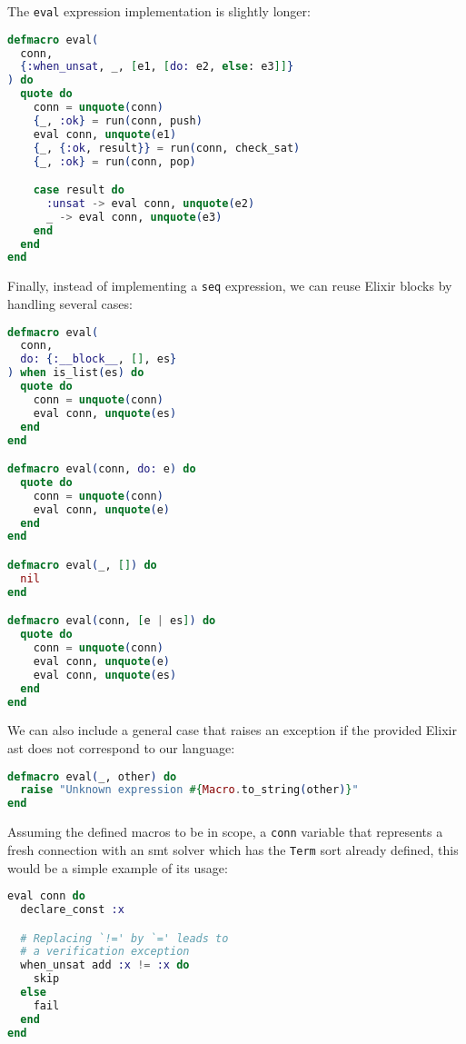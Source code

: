 The \verb|eval| expression implementation is slightly longer:

\begin{lstlisting}[language=elixir,numbers=none,frame=none]
defmacro eval(
  conn, 
  {:when_unsat, _, [e1, [do: e2, else: e3]]}
) do
  quote do
    conn = unquote(conn)
    {_, :ok} = run(conn, push)
    eval conn, unquote(e1)
    {_, {:ok, result}} = run(conn, check_sat)
    {_, :ok} = run(conn, pop)

    case result do
      :unsat -> eval conn, unquote(e2)
      _ -> eval conn, unquote(e3)
    end
  end
end
\end{lstlisting}

Finally, instead of implementing a \verb|seq| expression, we can reuse 
Elixir blocks by handling several cases:

\begin{lstlisting}[language=elixir,numbers=none,frame=none]
defmacro eval(
  conn, 
  do: {:__block__, [], es}
) when is_list(es) do
  quote do
    conn = unquote(conn)
    eval conn, unquote(es)
  end
end

defmacro eval(conn, do: e) do
  quote do
    conn = unquote(conn)
    eval conn, unquote(e)
  end
end

defmacro eval(_, []) do
  nil
end

defmacro eval(conn, [e | es]) do
  quote do
    conn = unquote(conn)
    eval conn, unquote(e)
    eval conn, unquote(es)
  end
end
\end{lstlisting}

We can also include a general case that raises an exception if 
the provided Elixir \gls{ast} does not correspond to our language:

\begin{lstlisting}[language=elixir,numbers=none,frame=none]
defmacro eval(_, other) do
  raise "Unknown expression #{Macro.to_string(other)}"
end
\end{lstlisting}

Assuming the defined macros to be in scope, a \verb|conn| variable that
represents a fresh connection with an \acrshort{smt} solver which
has the \verb|Term| sort already defined, this would be a simple example
of its usage:

\begin{lstlisting}[language=elixir,numbers=none,frame=none]
eval conn do
  declare_const :x

  # Replacing `!=' by `=' leads to 
  # a verification exception
  when_unsat add :x != :x do
    skip
  else
    fail
  end
end
\end{lstlisting}
